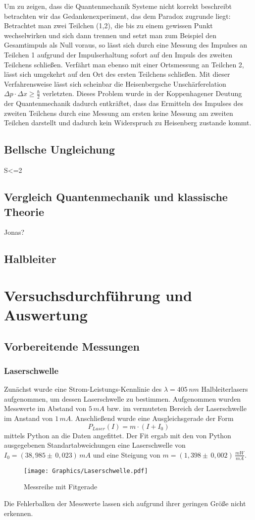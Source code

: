 \documentclass[twoside,colorback,accentcolor=tud4c,11pt]{tudreport}
\begin{document}
Um zu zeigen, dass die Quantenmechanik Systeme nicht korrekt beschreibt betrachten wir das Gedankenexperiment, das dem Paradox zugrunde liegt:
Betrachtet man zwei Teilchen (1,2), die bis zu einem gewissen Punkt wechselwirken und sich dann trennen und setzt man zum Beispiel den Gesamtimpuls als Null voraus, so lässt sich durch eine Messung des Impulses an Teilchen 1 aufgrund der Impulserhaltung sofort auf den Impuls des zweiten Teilchens schließen. Verfährt man ebenso mit einer Ortsmessung an Teilchen 2, lässt sich umgekehrt auf den Ort des ersten Teilchens schließen. Mit dieser Verfahrensweise lässt sich scheinbar die Heisenbergsche Unschärferelation $\Delta p\cdot\Delta x\geq\frac{\hbar}{2}$ verletzten. Dieses Problem wurde in der Koppenhagener Deutung der Quantenmechanik dadurch entkräftet, dass das Ermitteln des Impulses des zweiten Teilchens durch eine Messung am ersten keine Messung am zweiten Teilchen darstellt und dadurch kein Widerspruch zu Heisenberg zustande kommt.
\section{Bellsche Ungleichung}
S<=2
\section{Vergleich Quantenmechanik und klassische Theorie}
Jonas?
\section{Halbleiter}
\chapter{Versuchsdurchführung und Auswertung}
\section{Vorbereitende Messungen}
\subsection{Laserschwelle}
Zunächst wurde eine Strom-Leistungs-Kennlinie des $\lambda=405\,\si{nm}$ Halbleiterlasers aufgenommen, um dessen Laserschwelle zu bestimmen. Aufgenommen wurden Messwerte im Abstand von $5\,\si{mA}$ bzw. im vermuteten Bereich der Laserschwelle im Anstand von $1\,\si{mA}$. Anschließend wurde eine Ausgleichsgerade der Form
\begin{equation}
P_{Laser}(I)=m\cdot\left(I+I_{0}\right)
\end{equation}
mittels Python an die Daten angefittet. Der Fit ergab mit den von Python ausgegebenen Standartabweichungen eine Laserschwelle von $I_{0}=\left(38,985\pm\,0,023\right)\,\si{mA}$ und eine Steigung von $m=\left(1,398\pm\,0,002\right)\,\si{\frac{mW}{mA}}$.
\begin{figure}[H]
\centering
   	\begin{minipage}[b]{1.0\textwidth}
   	\texttt{[image: Graphics/Laserschwelle.pdf]}
   	\caption{Messreihe mit Fitgerade}
  	\label{laserschwelle}
   	\end{minipage}
\end{figure}
Die Fehlerbalken der Messwerte lassen sich aufgrund ihrer geringen Größe nicht erkennen.
\end{document}

